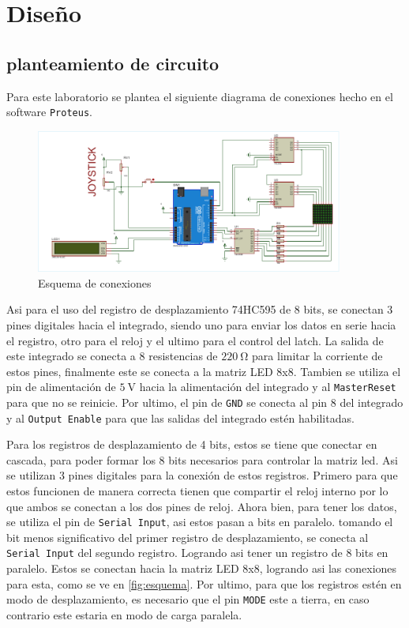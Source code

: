 \section{Diseño}

\subsection{planteamiento de circuito}
Para este laboratorio se plantea el siguiente diagrama de conexiones hecho en el software \texttt{Proteus}.
\begin{figure}[h!]
    \centering
    \includegraphics[width=0.9\textwidth]{Diagramas/xfcolor_cropped.pdf}
    \caption{Esquema de conexiones}
    \label{fig:esquema}
\end{figure}

Asi para el uso del registro de desplazamiento 74HC595 de 8 bits, se conectan 3 pines digitales hacia el integrado, siendo uno para enviar los datos en serie 
hacia el registro, otro para el reloj y el ultimo para el control del latch. La salida de este integrado se conecta a 8 resistencias de $\SI{220}{\ohm}$
para limitar la corriente de estos pines, finalmente este se conecta a la matriz LED 8x8. Tambien se utiliza el pin de alimentación de $\SI{5}{\volt}$ hacia 
la alimentación del integrado y al \texttt{MasterReset} para que no se reinicie. Por ultimo, el pin de \texttt{GND} se conecta al pin 8 del integrado y al \texttt{Output Enable}
para que las salidas del integrado estén habilitadas. 

Para los registros de desplazamiento de 4 bits, estos se tiene que conectar en cascada, para poder formar los 8 bits necesarios para controlar la matriz led.
Asi se utilizan 3 pines digitales para la conexión de estos registros. Primero para que estos funcionen de manera correcta tienen que compartir el reloj interno
por lo que ambos se conectan a los dos pines de reloj. Ahora bien, para tener los datos, se utiliza el pin de \texttt{Serial Input}, asi estos pasan a bits en paralelo.
tomando el bit menos significativo del primer registro de desplazamiento, se conecta al \texttt{Serial Input} del segundo registro. Logrando asi tener un registro de 8 bits 
en paralelo. Estos se conectan hacia la matriz LED 8x8, logrando asi las conexiones para esta, como se ve en \autoref{fig:esquema}. Por ultimo, para que los registros estén
en modo de desplazamiento, es necesario que el pin \texttt{MODE} este a tierra, en caso contrario este estaria en modo de carga paralela.

